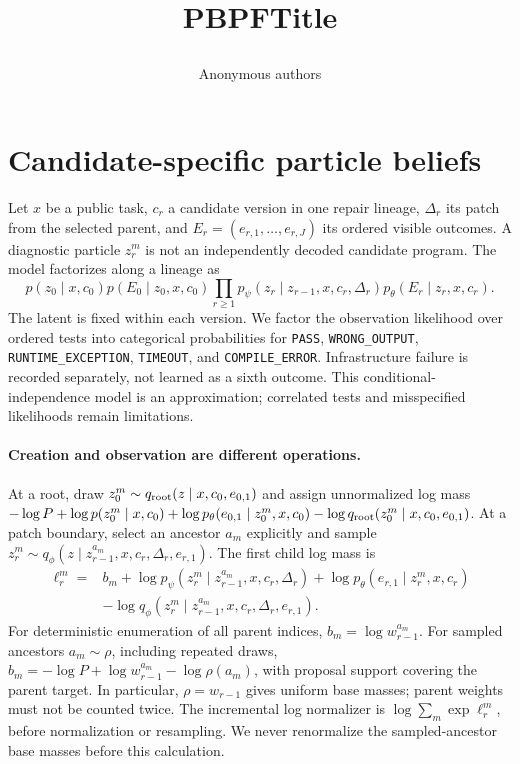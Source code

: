 \documentclass{article}
\title{\raggedright\csname PBPFTitle\TitleVersion\endcsname}
\author{Anonymous authors}
\providecommand{\AbstractVersion}{1}
\providecommand{\IntroVersion}{1}
\edef\AbstractVersion{\number\numexpr\AbstractVersion\relax}
\edef\IntroVersion{\number\numexpr\IntroVersion\relax}
\begin{document}
\maketitle
\begin{abstract}

\end{abstract}


\section{Candidate-specific particle beliefs}
\label{sec:method}
Let $x$ be a public task, $c_r$ a candidate version in one repair lineage,
$\Delta_r$ its patch from the selected parent, and
$E_r=(e_{r,1},\ldots,e_{r,J})$ its ordered visible outcomes. A diagnostic
particle $z_r^m$ is not an independently decoded candidate program.
The model factorizes along a lineage as
\begin{equation}
 p(z_0\mid x,c_0)p(E_0\mid z_0,x,c_0)
 \prod_{r\geq1}p_\psi(z_r\mid z_{r-1},x,c_r,\Delta_r)
 p_\theta(E_r\mid z_r,x,c_r).
\end{equation}
The latent is fixed within each version. We factor the observation likelihood
over ordered tests into categorical probabilities for \texttt{PASS},
\texttt{WRONG\_OUTPUT}, \texttt{RUNTIME\_EXCEPTION}, \texttt{TIMEOUT}, and
\texttt{COMPILE\_ERROR}. Infrastructure failure is recorded separately, not
learned as a sixth outcome. This conditional-independence model is an
approximation; correlated tests and misspecified likelihoods remain limitations.

\paragraph{Creation and observation are different operations.}
At a root, draw $z_0^m\sim q_{\rm root}(z\mid x,c_0,e_{0,1})$ and assign
unnormalized log mass
$-\log P+\log p(z_0^m\mid x,c_0)+\log p_\theta(e_{0,1}\mid z_0^m,x,c_0)
-\log q_{\rm root}(z_0^m\mid x,c_0,e_{0,1})$.
At a patch boundary, select an ancestor $a_m$ explicitly and sample
$z_r^m\sim q_\phi(z\mid z_{r-1}^{a_m},x,c_r,\Delta_r,e_{r,1})$.
The first child log mass is
\begin{align}
 \ell_r^m={}&b_m+\log p_\psi(z_r^m\mid z_{r-1}^{a_m},x,c_r,\Delta_r)
 +\log p_\theta(e_{r,1}\mid z_r^m,x,c_r)\nonumber\\
 &-\log q_\phi(z_r^m\mid z_{r-1}^{a_m},x,c_r,\Delta_r,e_{r,1}).
 \label{eq:child}
\end{align}
For deterministic enumeration of all parent indices, $b_m=\log w_{r-1}^{a_m}$.
For sampled ancestors $a_m\sim\rho$, including repeated draws,
$b_m=-\log P+\log w_{r-1}^{a_m}-\log\rho(a_m)$, with proposal support covering
the parent target. In particular, $\rho=w_{r-1}$ gives uniform base masses;
parent weights must not be counted twice. The incremental log normalizer is
$\log\sum_m\exp\ell_r^m$, before normalization or resampling. We never
renormalize the sampled-ancestor base masses before this calculation.
\end{document}
